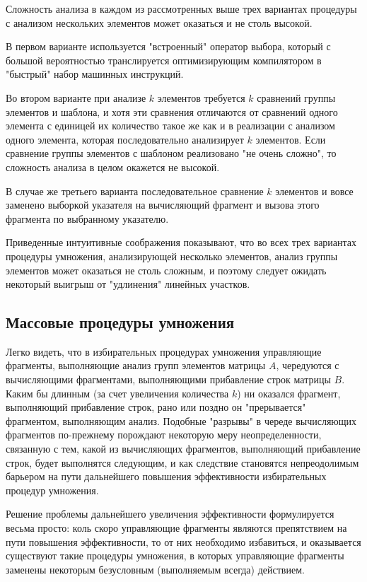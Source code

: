 \documentclass[a4paper,12pt]{report}
\begin{document}
Сложность анализа в каждом из рассмотренных выше трех вариантах процедуры с анализом нескольких элементов может оказаться
и не столь высокой.

В первом варианте используется "встроенный"{} оператор выбора, который с большой вероятностью транслируется
оптимизирующим компилятором в "быстрый"{} набор машинных инструкций.

Во втором варианте при анализе $k$ элементов требуется $k$ сравнений группы элементов и шаблона, и хотя эти
сравнения отличаются от сравнений одного элемента с единицей их количество такое же как и в реализации с анализом
одного элемента, которая последовательно анализирует $k$ элементов. Если сравнение группы элементов с шаблоном
реализовано "не очень сложно"{}, то сложность анализа в целом окажется не высокой.

В случае же третьего варианта последовательное сравнение $k$ элементов и вовсе заменено выборкой указателя
на вычисляющий фрагмент и вызова этого фрагмента по выбранному указателю.

Приведенные интуитивные соображения показывают, что во всех трех вариантах процедуры умножения, анализирующей несколько
элементов, анализ группы элементов может оказаться не столь сложным, и поэтому следует ожидать некоторый выигрыш от
"удлинения"{} линейных участков.

\subsection { Массовые процедуры умножения } \label{subsection:RAM_massive_routines}

Легко видеть, что в избирательных процедурах умножения управляющие фрагменты, выполняющие анализ групп элементов матрицы $A$,
чередуются с вычисляющими фрагментами, выполняющими прибавление строк матрицы $B$. Каким бы длинным (за
счет увеличения количества $k$) ни оказался фрагмент, выполняющий прибавление строк, рано или поздно он "прерывается"{} фрагментом,
 выполняющим анализ. Подобные "разрывы"{} в череде вычисляющих фрагментов по-прежнему порождают некоторую меру неопределенности,
связанную с тем, какой из вычисляющих фрагментов, выполняющий прибавление строк, будет выполнятся следующим, и как следствие становятся
 непреодолимым барьером на пути дальнейшего повышения эффективности избирательных процедур умножения.

Решение проблемы дальнейшего увеличения эффективности формулируется весьма просто: коль скоро управляющие фрагменты являются
препятствием на пути повышения эффективности, то от них необходимо избавиться, и оказывается существуют такие процедуры умножения,
в которых управляющие фрагменты заменены некоторым безусловным (выполняемым всегда) действием.
\end{document}
